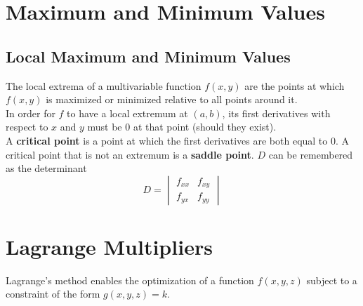 \documentclass[../Calculus_\Roman{3}]{subfiles}
\begin{document}
	\section{Maximum and Minimum Values}
		\subsection*{Local Maximum and Minimum Values}
			The local extrema of a multivariable function $f(x, y)$ are the points at which $f(x, y)$ is maximized or minimized relative to all points around it. \\
			In order for $f$ to have a local extremum at $(a, b)$, its first derivatives with respect to $x$ and $y$ must be 0 at that point (should they exist). \\
			A \textbf{critical point} is a point at which the first derivatives are both equal to 0. A critical point that is not an extremum is a \textbf{saddle point}.
			$D$ can be remembered as the determinant
				\[
					D
						= \begin{vmatrix}
							f_{xx} &
								f_{xy} \\
							f_{yx} &
								f_{yy}
						\end{vmatrix}
				\]
	\section{Lagrange Multipliers}
		Lagrange's method enables the optimization of a function $f(x, y, z)$ subject to a constraint of the form $g(x, y, z) = k$.
\end{document}
